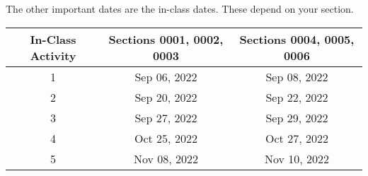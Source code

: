 \documentclass[11pt]{paper}
\begin{document}
The other important dates are the in-class dates. These depend on your section.

\begin{flushleft}
\begin{tabular}{ c  c  c }\hline
 In-Class Activity & Sections 0001, 0002, 0003 & Sections 0004, 0005, 0006 \\\hline
 1 & Sep 06, 2022 & Sep 08, 2022 \\
 2 & Sep 20, 2022 & Sep 22, 2022\\
 3 & Sep 27, 2022 & Sep 29, 2022\\
 4 & Oct 25, 2022 & Oct 27, 2022\\
 5 & Nov 08, 2022 & Nov 10, 2022 \\\hline
\end{tabular}
\end{flushleft}






\end{document}

